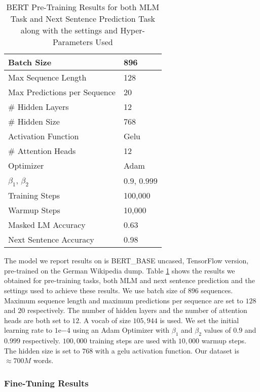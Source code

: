 \begin{table}[!ht]
	\centering
	\begin{tabular}{|l|l|}
		\hline
		Batch Size						&	896				\\ \hline
		Max Sequence Length				&	128				\\ \hline
		Max Predictions per Sequence	&	20 				\\ \hline
		\# Hidden Layers				&	12				\\ \hline
		\# Hidden Size					&	768				\\ \hline
		Activation Function				& 	Gelu			\\ \hline
		\# Attention Heads				& 	12 				\\ \hline
		Optimizer						& 	Adam 			\\ \hline
		$\beta_1$, $\beta_2$ 			& 	$0.9$, $0.999$ 	\\ \hline
		Training Steps 					& 	100,000 		\\ \hline
		Warmup Steps 					& 	10,000 			\\ \hline
		\hline
		Masked LM Accuracy 		 		&   0.63    		\\ \hline
		Next Sentence Accuracy   		&   0.98    		\\ \hline
		
	\end{tabular}
	\caption{BERT Pre-Training Results for both MLM Task and Next Sentence Prediction Task along with the settings and Hyper-Parameters Used}
	\label{results:table2}
\end{table}

The model we report results on is \ac{BERT}\_BASE uncased, TensorFlow version, pre-trained on the German Wikipedia dump. Table \ref{results:table2} shows the results we obtained for pre-training tasks, both \ac{MLM} and next sentence prediction and the settings used to achieve these results. We use batch size of $896$ sequences. Maximum sequence length and maximum predictions per sequence are set to $128$ and $20$ respectively. The number of hidden layers and the number of attention heads are both set to $12$. A vocab of size $105,944$ is used. We set the initial learning rate to $1\mathrm{e}{-4}$ using an Adam Optimizer with $\beta_1$ and $\beta_2$ values of $0.9$ and $0.999$ respectively. $100,000$ training steps are used with $10,000$ warmup steps. The hidden size is set to $768$ with a gelu activation function. Our dataset is $\approx700M$ words.




\subsubsection{Fine-Tuning Results}
\label{res:s2_sub2_subsub2}

